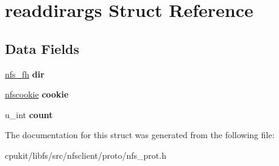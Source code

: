 \hypertarget{structreaddirargs}{}\section{readdirargs Struct Reference}
\label{structreaddirargs}
\subsection*{Data Fields}
\begin{DoxyCompactItemize}
\item 
\mbox{\label{structreaddirargs_a6ace7ade2591b1e0d0d98eb27295d4f9}} 
\mbox{\hyperlink{structnfs__fh}{nfs\+\_\+fh}} {\bfseries dir}
\item 
\mbox{\label{structreaddirargs_afa8dbfc1351cb6fd041d5047bdfcfa17}} 
\mbox{\hyperlink{structnfscookie}{nfscookie}} {\bfseries cookie}
\item 
\mbox{\label{structreaddirargs_a79f72b02062cd3aa5a5121faf24b3900}} 
u\+\_\+int {\bfseries count}
\end{DoxyCompactItemize}


The documentation for this struct was generated from the following file\+:\begin{DoxyCompactItemize}
\item 
cpukit/libfs/src/nfsclient/proto/nfs\+\_\+prot.\+h\end{DoxyCompactItemize}
